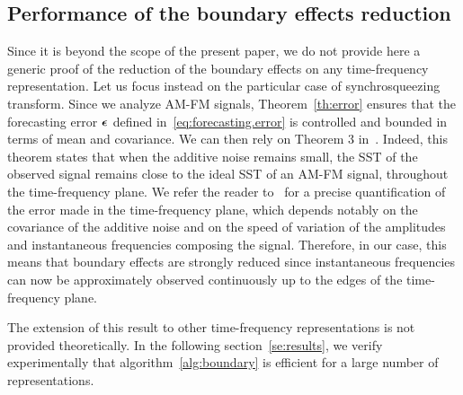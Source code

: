 \subsection{Performance of the boundary effects reduction}
\label{sse:perf.BoundEffRed}
Since it is beyond the scope of the present paper, we do not provide here a generic proof of the reduction of the boundary effects on any time-frequency representation. Let us focus instead on the particular case of synchrosqueezing transform. Since we analyze AM-FM signals, Theorem~\ref{th:error} ensures that the forecasting error $\boldsymbol{\epsilon}$ defined in~\eqref{eq:forecasting.error} is controlled and bounded in terms of mean and covariance. We can then rely on Theorem 3 in~\cite{Chen14nonparametric}. Indeed, this theorem states that when the additive noise remains small, the SST of the observed signal remains close to the ideal SST of an AM-FM signal, throughout the time-frequency plane.  We refer the reader to~\cite{Chen14nonparametric} for a precise quantification of the error made in the time-frequency plane, which depends notably on the covariance of the additive noise and on the speed of variation of the amplitudes and instantaneous frequencies composing the signal. Therefore, in our case, this means that boundary effects are strongly reduced since instantaneous frequencies can now be approximately observed continuously up to the edges of the time-frequency plane.

The extension of this result to other time-frequency representations is not provided theoretically. In the following section~\ref{se:results}, we verify experimentally that algorithm~\ref{alg:boundary} is efficient for a large number of representations.